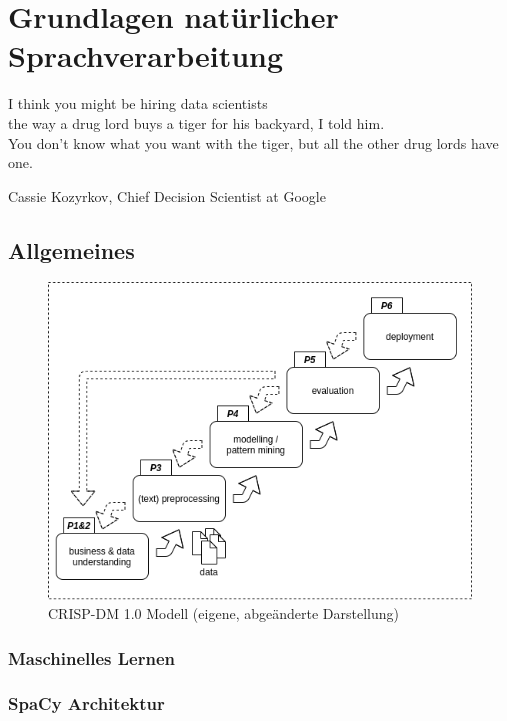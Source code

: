 \chapter{Grundlagen natürlicher Sprachverarbeitung}
\label{cha:grundlagennlp}

\epigraph{\glqq I think you might be hiring data scientists\\the way a drug lord buys a tiger for his backyard\grqq{}, I told him.\\ \glqq You don’t know what you want with the tiger, but all the other drug lords have one.\grqq{}}{Cassie Kozyrkov, Chief Decision Scientist at Google}

\section{Allgemeines}
\label{sec:allgemeines}

\lipsum[3]

\begin{figure}[!ht]
    \centering
    \includegraphics[width=0.9\linewidth]{media/nlp-workflow.png}
    \caption{CRISP-DM 1.0 Modell (eigene, abgeänderte Darstellung)}
    \label{fig:nlp_workflow}
\end{figure}

\lipsum[1]

\subsection{Maschinelles Lernen}
\label{sec:maschinelleslernen}

\lipsum[2]

\subsection{SpaCy Architektur}
\label{sec:spacyarchitektur}

